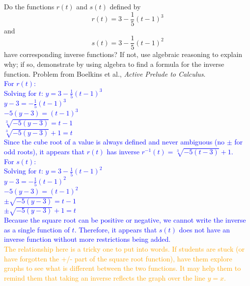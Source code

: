 \documentclass{ximera}
\begin{document}
\begin{exercise}
     Do the functions $r(t)$ and $s(t)$ defined by
        \[r(t)=3-\frac15(t-1)^3\]
    and 
        \[s(t)=3-\frac15(t-1)^2\]
    have corresponding inverse functions? If not, use algebraic reasoning to explain why; if so, demonstrate by using algebra to find a formula for the inverse function.
    Problem from Boelkins et al., \textit{Active Prelude to Calculus}.\\
    \textcolor{blue}{For $r(t)$:\\
    Solving for $t$: $y=3-\frac15(t-1)^3$\\
    $y-3=-\frac15(t-1)^3$\\
    $-5(y-3)=(t-1)^3$\\
    $\sqrt[3]{-5(y-3)}=t-1$\\
    $\sqrt[3]{-5(y-3)}+1=t$\\
    Since the cube root of a value is always defined and never ambiguous (no $\pm$ for odd roots), it appears that $r(t)$ has inverse $r^{-1}(t)=\sqrt[3]{-5(t-3)}+1$.\\
    For $s(t)$:\\
    Solving for $t$:  $y=3-\frac15(t-1)^2$\\
    $y-3=-\frac15(t-1)^2$\\
    $-5(y-3)=(t-1)^2$\\
    $\pm\sqrt{-5(y-3)}=t-1$\\
    $\pm\sqrt{-5(y-3)}+1=t$\\
    Because the square root can be positive or negative, we cannot write the inverse as a single function of $t$. Therefore, it appears that $s(t)$ does not have an inverse function without more restrictions being added. }\\
    \textcolor{orange}{The relationship here is a tricky one to put into words.  If students are stuck (or have forgotten the +/- part of the square root function), have them explore graphs to see what is different between the two functions.  It may help them to remind them that taking an inverse reflects the graph over the line $y=x$.}
\end{exercise}
\end{document}
